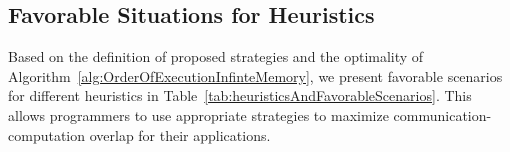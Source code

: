 \documentclass[sigconf]{acmart}
\begin{document}
{		\subsection{Favorable Situations for Heuristics}
		Based on the definition of proposed strategies and the optimality of Algorithm~\ref{alg:OrderOfExecutionInfinteMemory}, we present favorable scenarios for different heuristics in Table~\ref{tab:heuristicsAndFavorableScenarios}. This allows programmers to use appropriate strategies to maximize communication-computation overlap for their applications.
		
		
}
\end{document}
